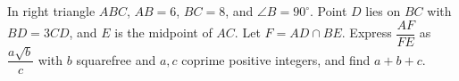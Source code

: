 In right triangle $ABC$, $AB=6$, $BC=8$, and $\angle B=90^\circ$. Point $D$ lies on $BC$ with $BD=3CD$, and $E$ is the midpoint of $AC$. Let $F=AD\cap BE$. Express $\dfrac{AF}{FE}$ as $\dfrac{a\sqrt b}{c}$ with $b$ squarefree and $a,c$ coprime positive integers, and find $a+b+c$.
